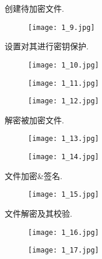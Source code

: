 \documentclass[../main.tex]{subfiles}
\begin{document}
创建待加密文件.
\begin{figure}[H]
  \begin{center}
    \texttt{[image: 1\_9.jpg]}
  \end{center}
\end{figure}

设置对其进行密钥保护.
\begin{figure}[H]
  \begin{center}
    \texttt{[image: 1\_10.jpg]}
  \end{center}
\end{figure}
\begin{figure}[H]
  \begin{center}
    \texttt{[image: 1\_11.jpg]}
  \end{center}
\end{figure}
\begin{figure}[H]
  \begin{center}
    \texttt{[image: 1\_12.jpg]}
  \end{center}
\end{figure}

解密被加密文件.
\begin{figure}[H]
  \begin{center}
    \texttt{[image: 1\_13.jpg]}
  \end{center}
\end{figure}
\begin{figure}[H]
  \begin{center}
    \texttt{[image: 1\_14.jpg]}
  \end{center}
\end{figure}

文件加密\&签名.
\begin{figure}[H]
  \begin{center}
    \texttt{[image: 1\_15.jpg]}
  \end{center}
\end{figure}

文件解密及其校验.
\begin{figure}[H]
  \begin{center}
    \texttt{[image: 1\_16.jpg]}
  \end{center}
\end{figure}
\begin{figure}[H]
  \begin{center}
    \texttt{[image: 1\_17.jpg]}
  \end{center}
\end{figure}
\end{document}
